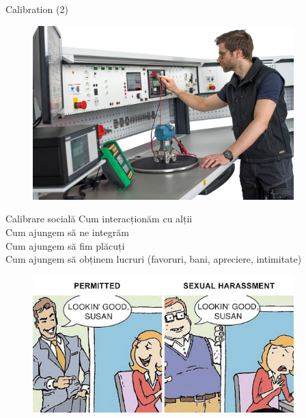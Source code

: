 \documentclass{simple}
\begin{document}
\begin{frame}{Calibration (2)}
  \begin{figure}
    \centering
    \includegraphics[width=0.9\textwidth]{img/calibration-engine.jpg}
  \end{figure}
\end{frame}

\begin{frame}{Calibrare socială}
  \centering
  \pause Cum interacționăm cu alții \\
  \vspace{3mm}
  \pause Cum ajungem să ne integrăm \\
  \vspace{3mm}
  \pause Cum ajungem să fim plăcuți \\
  \vspace{3mm}
  \pause Cum ajungem să obținem lucruri (favoruri, bani, apreciere, intimitate)
\end{frame}

\begin{frame}{}
  \begin{figure}
    \centering
    \includegraphics[width=0.9\textwidth]{img/looking-good-susan.jpg}
  \end{figure}
\end{frame}
\end{document}
